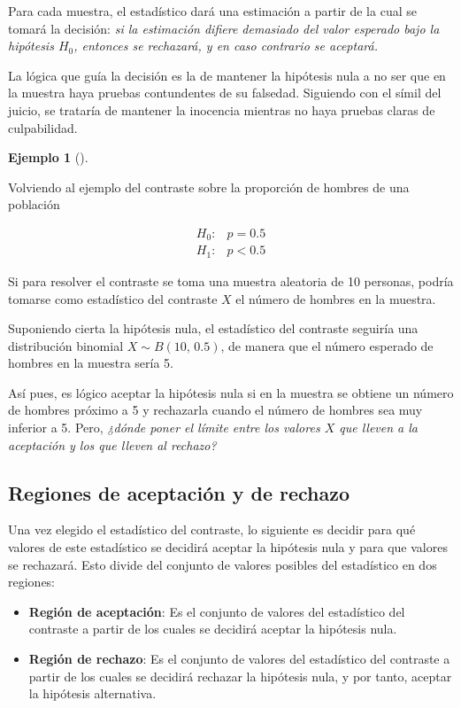 \documentclass[
  a4paper,
]{scrreport}
\theoremstyle{plain}
\theoremstyle{definition}
\newtheorem{example}{Ejemplo}[chapter]
\theoremstyle{definition}
\theoremstyle{remark}
\begin{document}
Para cada muestra, el estadístico dará una estimación a partir de la
cual se tomará la decisión: \emph{si la estimación difiere demasiado del
valor esperado bajo la hipótesis \(H_0\), entonces se rechazará, y en
caso contrario se aceptará.}

La lógica que guía la decisión es la de mantener la hipótesis nula a no
ser que en la muestra haya pruebas contundentes de su falsedad.
Siguiendo con el símil del juicio, se trataría de mantener la inocencia
mientras no haya pruebas claras de culpabilidad.

\begin{example}[]\protect\hypertarget{exm-estadistico-contraste}{}\label{exm-estadistico-contraste}

Volviendo al ejemplo del contraste sobre la proporción de hombres de una
población

\begin{align*}
H_0: & p=0.5 \\
H_1: & p<0.5
\end{align*}

Si para resolver el contraste se toma una muestra aleatoria de 10
personas, podría tomarse como estadístico del contraste \(X\) el número
de hombres en la muestra.

Suponiendo cierta la hipótesis nula, el estadístico del contraste
seguiría una distribución binomial \(X\sim B(10,\,0.5)\), de manera que
el número esperado de hombres en la muestra sería 5.

Así pues, es lógico aceptar la hipótesis nula si en la muestra se
obtiene un número de hombres próximo a 5 y rechazarla cuando el número
de hombres sea muy inferior a 5. Pero, \emph{¿dónde poner el límite
entre los valores \(X\) que lleven a la aceptación y los que lleven al
rechazo?}

\end{example}

\subsection{Regiones de aceptación y de
rechazo}\label{regiones-de-aceptaciuxf3n-y-de-rechazo}

Una vez elegido el estadístico del contraste, lo siguiente es decidir
para qué valores de este estadístico se decidirá aceptar la hipótesis
nula y para que valores se rechazará. Esto divide del conjunto de
valores posibles del estadístico en dos regiones:

\begin{itemize}
\item
  \textbf{Región de aceptación}: Es el conjunto de valores del
  estadístico del contraste a partir de los cuales se decidirá aceptar
  la hipótesis nula.
\item
  \textbf{Región de rechazo}: Es el conjunto de valores del estadístico
  del contraste a partir de los cuales se decidirá rechazar la hipótesis
  nula, y por tanto, aceptar la hipótesis alternativa.
\end{itemize}
\end{document}
